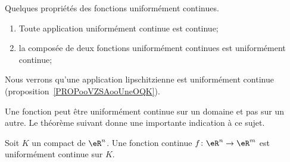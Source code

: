 \begin{proposition}
	Quelques propriétés des fonctions uniformément continues.
	\begin{enumerate}
		\item
			Toute application uniformément continue est continue;
		\item
			la composée de deux fonctions uniformément continues est uniformément continue;
	\end{enumerate}
\end{proposition}
Nous verrons qu'une application lipschitzienne est uniformément continue (proposition~\ref{PROPooVZSAooUneOQK}).

Une fonction peut être uniformément continue sur un domaine et pas sur un autre. Le théorème suivant donne une importante indication à ce sujet.
\begin{theorem}[Heine]		\label{ThoHeineContinueCompact}
    Soit \( K\) un compact de \( \eR^n\). Une fonction continue \( f\colon \eR^n\to \eR^m\) est uniformément continue sur \( K\).
\end{theorem}

